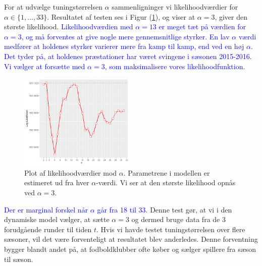 \documentclass[11pt,a4paper]{article}
\begin{document}
\par For at udvælge tuningstørrelsen $\alpha$ sammenligninger vi likelihoodværdier for $\alpha \in \{1,...,33\}$. Resultatet af testen ses i Figur (\ref{fig:AlphaPlot}), og viser at $\alpha=3$, giver den største likelihood. \textcolor{blue}{Likelihoodværdien med $\alpha=13$ er meget tæt på værdien for $\alpha=3$, og må forventes at give nogle mere gennemsnitlige styrker. En lav $\alpha$ værdi medfører at holdenes styrker varierer mere fra kamp til kamp, end ved en høj $\alpha$. Det tyder på, at holdenes præstationer har været svingene i sæsonen 2015-2016. Vi vælger at forsætte med $\alpha=3$, som maksimalisere vores likelihoodfunktion}.
\begin{figure}[htb!]
\begin{center}
    \includegraphics[width=0.49\textwidth]{AlphaBestPlot.png}
    \caption{Plot af likelihoodværdier mod $\alpha$. Parametrene i modellen er estimeret ud fra hver $\alpha$-værdi. Vi ser at den største likelihood opnås ved $\alpha=3$. }
    \label{fig:AlphaPlot}
\end{center}
\end{figure}
\textcolor{blue}{Der er marginal forskel når $\alpha$ går fra 18 til 33}. Denne test gør, at vi i den dynamiske model vælger, at sætte $\alpha=3$ og dermed bruge data fra de 3 forudgående runder til tiden $t$. Hvis vi havde testet tuningstørrelsen over flere sæsoner, vil det være forventeligt at resultatet blev anderledes. Denne forventning bygger blandt andet på, at fodboldklubber ofte køber og sælger spillere fra sæson til sæson.
\end{document}
